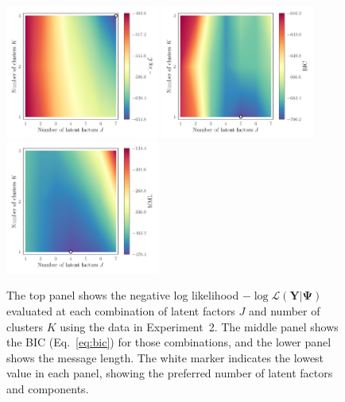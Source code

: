 \documentclass[twocolumn]{aastex62}
\newcommand{\vect}[1]{\boldsymbol{\mathbf{#1}}}
\renewcommand{\vec}[1]{\vect{#1}}
\newcommand{\data}{\textbf{Y}}
\newcommand{\NumLatentFactors}{J}
\newcommand{\NumComponents}{K}
\begin{document}
\begin{figure}
	\includegraphics[width=0.45\textwidth]{experiments/exp2-log-xfe-offset-gridsearch-ll.pdf}
	\includegraphics[width=0.45\textwidth]{experiments/exp2-log-xfe-offset-gridsearch-bic.pdf}
	\includegraphics[width=0.45\textwidth]{experiments/exp2-log-xfe-offset-gridsearch-mml.pdf}
    \caption{The top panel shows the negative log likelihood 
			 $-\log{\mathcal{L}\left(\data|\vec\Psi\right)}$ 
			 evaluated at each combination of latent factors 
			 $\NumLatentFactors$ and number of clusters 
			 $\NumComponents$ using the \citet{Barklem:2005}
			 data in Experiment~2.  The middle panel shows 
			 the BIC (Eq.~\ref{eq:bic}) for those 
			 combinations, and the lower panel shows the 
			 message length. The white marker indicates the
			 lowest value in each panel, showing the
			 preferred number of latent factors and components.}
    \label{fig:exp2-gridsearch-contours}
\end{figure}

\end{document}
